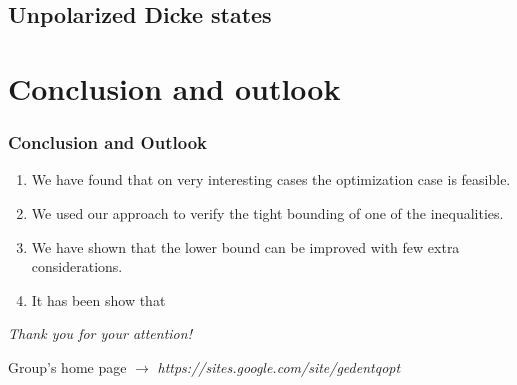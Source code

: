 \documentclass{beamer}
\begin{document}
	\subsection{Unpolarized Dicke states}

		\begin{frame}


		\end{frame}

\section{Conclusion and outlook}

	\begin{frame}
		\frametitle{Conclusion and Outlook}
		\begin{enumerate}
			\item<1-> We have found that on very interesting cases the optimization case is feasible.
			\item<2-> We used our approach to verify the tight bounding of one of the inequalities.
			\item<3-> We have shown that the lower bound can be improved with few extra considerations.
			\item<4-> It has been show that
		\end{enumerate}

	\end{frame}

	\begin{frame}
		\emph{\Large Thank you for your attention!}

		\vspace{5px}
		Group's home page $\rightarrow$ \emph{\color{blue} https://sites.google.com/site/gedentqopt}

	\end{frame}
\end{document}
